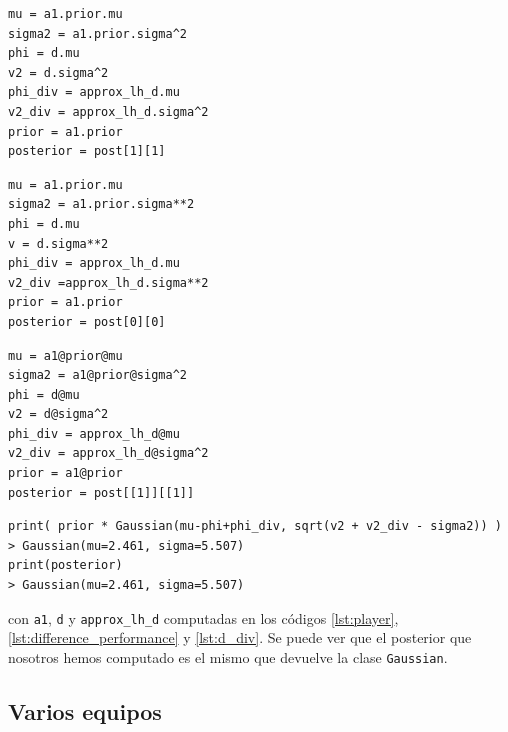 \documentclass[a4paper,11pt]{book}
\theoremstyle{definition}
\begin{document}
\begin{paracol}{3}
\begin{lstlisting}[backgroundcolor=\color{julia!60},belowskip=-0.77 \baselineskip]
mu = a1.prior.mu
sigma2 = a1.prior.sigma^2
phi = d.mu
v2 = d.sigma^2
phi_div = approx_lh_d.mu
v2_div = approx_lh_d.sigma^2
prior = a1.prior
posterior = post[1][1]
\end{lstlisting}
\switchcolumn
\begin{lstlisting}[backgroundcolor=\color{python!60},belowskip=-0.77 \baselineskip]
mu = a1.prior.mu
sigma2 = a1.prior.sigma**2
phi = d.mu
v = d.sigma**2
phi_div = approx_lh_d.mu
v2_div =approx_lh_d.sigma**2
prior = a1.prior
posterior = post[0][0]
\end{lstlisting}
\switchcolumn
\begin{lstlisting}[backgroundcolor=\color{r!50},belowskip=-0.77 \baselineskip]
mu = a1@prior@mu
sigma2 = a1@prior@sigma^2
phi = d@mu
v2 = d@sigma^2
phi_div = approx_lh_d@mu
v2_div = approx_lh_d@sigma^2
prior = a1@prior
posterior = post[[1]][[1]]
\end{lstlisting}
\end{paracol}
\begin{lstlisting}[captionpos=b,backgroundcolor=\color{all},label=lst:posterior_s1_approx, caption={Accediendo al posterior aproximado},belowskip=0cm]
print( prior * Gaussian(mu-phi+phi_div, sqrt(v2 + v2_div - sigma2)) )
> Gaussian(mu=2.461, sigma=5.507)
print(posterior)
> Gaussian(mu=2.461, sigma=5.507)
\end{lstlisting}
%
con \texttt{a1}, \texttt{d} y \texttt{approx\_lh\_d} computadas en los c\'odigos \ref{lst:player}, \ref{lst:difference_performance} y \ref{lst:d_div}.
%
Se puede ver que el posterior que nosotros hemos computado es el mismo que devuelve la clase \texttt{Gaussian}.

\subsection{Varios equipos} \label{sec:iterative_posterior}
\end{document}
